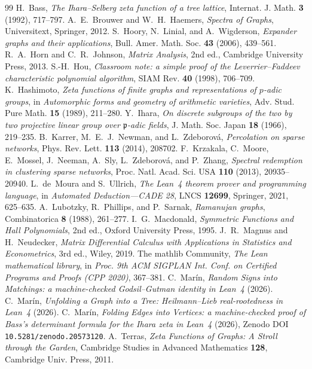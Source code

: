 \documentclass[11pt]{article}
\begin{document}
\begin{thebibliography}{99}
 H.~Bass, \emph{The Ihara--Selberg zeta function of a tree lattice}, Internat. J.
  Math. \textbf{3} (1992), 717--797.
 A.~E.~Brouwer and W.~H.~Haemers, \emph{Spectra of Graphs}, Universitext,
  Springer, 2012.
 S.~Hoory, N.~Linial, and A.~Wigderson, \emph{Expander graphs and their
  applications}, Bull. Amer. Math. Soc. \textbf{43} (2006), 439--561.
 R.~A.~Horn and C.~R.~Johnson, \emph{Matrix Analysis}, 2nd ed., Cambridge
  University Press, 2013.
 S.-H.~Hou, \emph{Classroom note: a simple proof of the Leverrier--Faddeev
  characteristic polynomial algorithm}, SIAM Rev. \textbf{40} (1998), 706--709.
 K.~Hashimoto, \emph{Zeta functions of finite graphs and representations of
  $p$-adic groups}, in \emph{Automorphic forms and geometry of arithmetic varieties}, Adv. Stud. Pure
  Math. \textbf{15} (1989), 211--280.
 Y.~Ihara, \emph{On discrete subgroups of the two by two projective linear group
  over $\mathfrak{p}$-adic fields}, J. Math. Soc. Japan \textbf{18} (1966), 219--235.
 B.~Karrer, M.~E.~J.~Newman, and L.~Zdeborov\'a, \emph{Percolation
  on sparse networks}, Phys. Rev. Lett. \textbf{113} (2014), 208702.
 F.~Krzakala, C.~Moore, E.~Mossel, J.~Neeman, A.~Sly, L.~Zdeborov\'a, and
  P.~Zhang, \emph{Spectral redemption in clustering sparse networks}, Proc. Natl. Acad. Sci. USA
  \textbf{110} (2013), 20935--20940.
 L.~de~Moura and S.~Ullrich, \emph{The Lean~4 theorem prover and programming
  language}, in \emph{Automated Deduction---CADE 28}, LNCS \textbf{12699}, Springer, 2021, 625--635.
 A.~Lubotzky, R.~Phillips, and P.~Sarnak, \emph{Ramanujan graphs}, Combinatorica
  \textbf{8} (1988), 261--277.
 I.~G.~Macdonald, \emph{Symmetric Functions and Hall Polynomials}, 2nd ed., Oxford
  University Press, 1995.
 J.~R.~Magnus and H.~Neudecker, \emph{Matrix Differential Calculus with
  Applications in Statistics and Econometrics}, 3rd ed., Wiley, 2019.
 The mathlib Community, \emph{The Lean mathematical library}, in \emph{Proc. 9th
  ACM SIGPLAN Int. Conf. on Certified Programs and Proofs (CPP 2020)}, 367--381.
 C.~Mar\'in, \emph{Random Signs into Matchings: a machine-checked Godsil--Gutman
  identity in Lean~4} (2026).
 C.~Mar\'in, \emph{Unfolding a Graph into a Tree: Heilmann--Lieb real-rootedness in
  Lean~4} (2026).
 C.~Mar\'in, \emph{Folding Edges into Vertices: a machine-checked proof of Bass's
  determinant formula for the Ihara zeta in Lean~4} (2026), Zenodo DOI
  \texttt{10.5281/zenodo.20573120}.
 A.~Terras, \emph{Zeta Functions of Graphs: A Stroll through the Garden},
  Cambridge Studies in Advanced Mathematics \textbf{128}, Cambridge Univ. Press, 2011.
\end{thebibliography}
\end{document}
